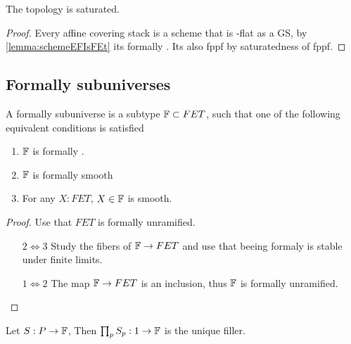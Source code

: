 \begin{corollary}
	The \etale topology is saturated.
\end{corollary}
\begin{proof}
	Every affine covering stack is a scheme that is \etale-flat as a GS, by \ref{lemma:schemeEFIsFEt} its formally \etale. Its also fppf by saturatedness of fppf.
\end{proof}
\subsection{Formally \etale subuniverses}
\begin{definition}{\label{lemma:FisFet}}
	A formally \etale subuniverse is a subtype $\mathbb{F} \subset FET$, such that one of the following equivalent conditions is satisfied
	\begin{enumerate}
		\item  $\mathbb{F}$ is formally \etale.
		\item $\mathbb{F}$ is formally smooth
		\item For any $X : FET$, $X \in \mathbb{F}$ is smooth.
	\end{enumerate}
\end{definition}
\begin{proof}
	Use that 	$FET$ is formally unramified.
	\begin{enumerate}
		\item [$2 \Leftrightarrow 3$] Study the fibers of $\mathbb{F} \to FET$ and use that beeing formaly \etale is stable under finite limits.
		\item [$1 \Leftrightarrow 2$]  The map $\mathbb{F} \to FET$ is an inclusion, thus $\mathbb{F}$ is formally unramified.
	\end{enumerate}
	
\end{proof}


\begin{lemma}{\label{cor:SubUnivDepProdStable}}
	Let $S : P \to \mathbb{F}$, Then $\prod_p S_p : 1 \to \mathsf{\mathbb{F}}$ is the unique filler.
\end{lemma}

